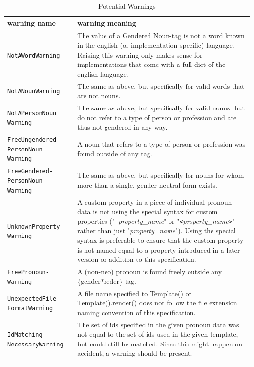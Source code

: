 \documentclass{article}
\begin{document}
    \begin{flushleft}
        \begin{center}
            \begin{longtable}{|>{\raggedright\arraybackslash}p{8em} | >{\raggedright\arraybackslash}p{28em} |}
                 \hline
                 warning name & warning meaning\\
                 \hline\hline
                 \texttt{NotAWordWarning} & The value of a Gendered Noun-tag is not a word known in the english (or implementation-specific) language.
                 Raising this warning only makes sense for implementations that come with a full dict of the english language.\\
                 \hline
                 \texttt{NotANounWarning} & The same as above, but specifically for valid words that are not nouns.\\
                 \hline
                 \texttt{NotAPersonNoun Warning} & The same as above, but specifically for valid nouns that do not refer to a type of person or profession and are thus not gendered in any way.\\
                 \hline
                 \texttt{FreeUngendered- PersonNoun- Warning} & A noun that refers to a type of person or profession was found outside of any tag.\\
                 \hline
                 \texttt{FreeGendered- PersonNoun- Warning} & The same as above, but specifically for nouns for whom more than a single, gender-neutral form exists.\\
                 \hline
                 \texttt{UnknownProperty- Warning} & A custom property in a piece of individual pronoun data is not using the special syntax for custom properties ("\texttt{\_}\emph{property\_name}" or "\texttt{<}\emph{property\_name}\texttt{>}" rather than just "\emph{property\_name}").
                 Using the special syntax is preferable to ensure that the custom property is not named equal to a property introduced in a later version or addition to this specification.\\
                 \hline
                 \texttt{FreePronoun- Warning} & A (non-neo) pronoun is found freely outside any \{gender*reder\}-tag.\\
                 \hline
                 \texttt{UnexpectedFile- FormatWarning} & A file name specified to Template() or Template().render() does not follow the file extension naming convention of this specification.\\
                 \hline
                 \texttt{IdMatching- NecessaryWarning} & The set of ids specified in the given pronoun data was not equal to the set of ids used in the given template, but could still be matched.
                 Since this might happen on accident, a warning should be present.\\
                 \hline
                \caption{Potential Warnings}
            \end{longtable}
        \end{center}
    \end{flushleft}
\end{document}
